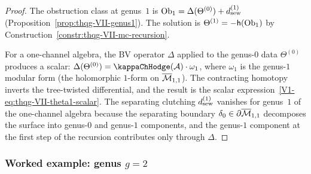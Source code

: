 \begin{proof}
The obstruction class at genus~$1$ is
$\mathrm{Ob}_1 = \Delta(\Theta^{(0)}) + d_{\mathrm{sew}}^{(1)}$
(Proposition~\ref{prop:thqg-VII-genus1}). The solution is
$\Theta^{(1)} = -\mathsf{h}(\mathrm{Ob}_1)$ by
Construction~\ref{constr:thqg-VII-mc-recursion}.

For a one-channel algebra, the BV operator $\Delta$ applied to
the genus-$0$ data $\Theta^{(0)}$ produces a scalar:
$\Delta(\Theta^{(0)}) = \kappaChHodge(\cA) \cdot \omega_1$, where
$\omega_1$ is the genus-$1$ modular form (the holomorphic
$1$-form on $\overline{\mathcal{M}}_{1,1}$). The contracting homotopy
inverts the tree-twisted differential, and the result is the
scalar expression~\eqref{V1-eq:thqg-VII-theta1-scalar}.
The separating clutching $d_{\mathrm{sew}}^{(1)}$ vanishes for genus~$1$
of the one-channel algebra because the separating boundary
$\delta_0 \in \partial\overline{\mathcal{M}}_{1,1}$ decomposes the
surface into genus-$0$ and genus-$1$ components, and the
genus-$1$ component at the first step of the recursion
contributes only through $\Delta$.
\end{proof}

\subsubsection{Worked example: genus $g = 2$}

